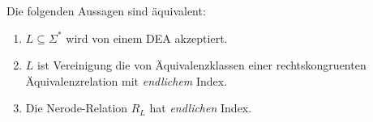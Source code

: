 \begin{Satz} %
        Die folgenden Aussagen sind äquivalent:
        \begin{enumerate}
                \item\label{itm:Nerode1} $L\subseteq \Sigma^*$ wird von einem \ac{DEA} akzeptiert.
                \item\label{itm:Nerode2} $L$ ist Vereinigung die von Äquivalenzklassen einer rechtskongruenten Äquivalenzrelation mit \emph{endlichem} Index.
                \item\label{itm:Nerode3} Die Nerode-Relation $R_L$ hat \emph{endlichen} Index.
                \qedhere
        \end{enumerate}
\end{Satz}

